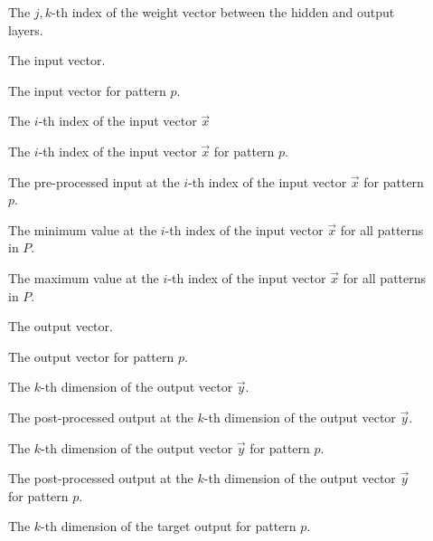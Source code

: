 \begin{description}
    \item
    [\parbox{1cm}{$w_{j,k}$}] The $j,k$-th index of the weight vector between the hidden and output layers.

    \item
    [\parbox{1cm}{$\vec{x}$}] The input vector.

    \item
    [\parbox{1cm}{$\vec{x}_p$}] The input vector for pattern $p$.

    \item
    [\parbox{1cm}{$x_i$}] The $i$-th index of the input vector $\vec{x}$

    \item
    [\parbox{1cm}{$x_{i,p}$}] The $i$-th index of the input vector $\vec{x}$ for pattern $p$.

    \item
    [\parbox{1cm}{$x_{i,p}'$}] The pre-processed input at the $i$-th index of the input vector $\vec{x}$ for pattern $p$.

    \item
    [\parbox{1cm}{$x_{i_{min}}$}] The minimum value at the  $i$-th index of the input vector $\vec{x}$  for all patterns in $P$.

    \item
    [\parbox{1cm}{$x_{i_{max}}$}] The maximum value at the  $i$-th index of the input vector $\vec{x}$  for all patterns in $P$.

    \item
    [\parbox{1cm}{$\vec{y}$}] The output vector.

    \item
    [\parbox{1cm}{$\vec{y}_p$}] The output vector for pattern $p$.

    \item
    [\parbox{1cm}{$y_k$}] The $k$-th dimension of the output vector $\vec{y}$.

    \item
    [\parbox{1cm}{$y_{k}'$}] The post-processed output at the $k$-th dimension of the output vector $\vec{y}$.

    \item
    [\parbox{1cm}{$y_{k,p}$}] The $k$-th dimension of the output vector $\vec{y}$ for pattern $p$.

    \item
    [\parbox{1cm}{$y_{k,p}'$}] The post-processed output at the $k$-th dimension of the output vector $\vec{y}$ for pattern $p$.

    \item
    [\parbox{1cm}{$\hat{y}_{k,p}$}] The $k$-th dimension of the target output for pattern $p$. 
\end{description}

